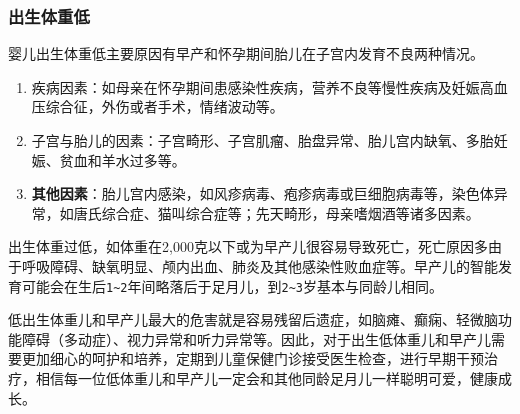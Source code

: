 \subsubsection{出生体重低}%

婴儿出生体重低主要原因有早产和怀孕期间胎儿在子宫内发育不良两种情况。

\begin{enumerate}
\item
  疾病因素：如母亲在怀孕期间患感染性疾病，营养不良等慢性疾病及妊娠高血压综合征，外伤或者手术，情绪波动等。
\item
  子宫与胎儿的因素：子宫畸形、子宫肌瘤、胎盘异常、胎儿宫内缺氧、多胎妊娠、贫血和羊水过多等。
\item
  \textbf{其他因素}：胎儿宫内感染，如风疹病毒、疱疹病毒或巨细胞病毒等，染色体异常，如唐氏综合症、猫叫综合症等；先天畸形，母亲嗜烟酒等诸多因素。
\end{enumerate}

出生体重过低，如体重在2,000克以下或为早产儿很容易导致死亡，死亡原因多由于呼吸障碍、缺氧明显、颅内出血、肺炎及其他感染性败血症等。早产儿的智能发育可能会在生后\texttt{1\textasciitilde{}2}\hspace{0pt}年间略落后于足月儿，到\texttt{2\textasciitilde{}3}\hspace{0pt}岁基本与同龄儿相同。

低出生体重儿和早产儿最大的危害就是容易残留后遗症，如脑瘫、癫痫、轻微脑功能障碍（多动症）、视力异常和听力异常等。因此，对于出生低体重儿和早产儿需要更加细心的呵护和培养，定期到儿童保健门诊接受医生检查，进行早期干预治疗，相信每一位低体重儿和早产儿一定会和其他同龄足月儿一样聪明可爱，健康成长。

